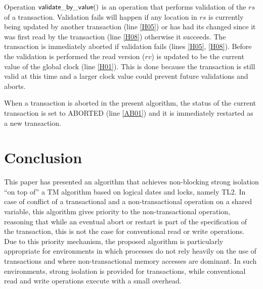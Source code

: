 \documentclass[11pt,letterpaper]{article}
\newcommand{\Xomit}[1]{}
\begin{document}
Operation ${\sf validate\_by\_value()}$ is an operation that performs 
validation of the $\mathit{rs}$ of a transaction. 
Validation fails 
will happen if any location in $\mathit{rs}$ is 
currently being updated by another transaction (line \ref{H05})
or has had its changed since it was first read by the transaction (line \ref{H08})
otherwise it succeeds.
The transaction is immediately aborted if validation fails (lines \ref{H05}, \ref{H08}).
Before the validation is performed the read version ($\mathit{rv}$) is updated
to be the current value of the global clock (line \ref{H01}).
This is done because the transaction is still valid at this time and a larger
clock value could prevent future validations and aborts.

When a transaction is aborted in the present algorithm, 
the status of the current transaction is set to ABORTED (line \ref{AB01}) and
it is immediately restarted as a new transaction.



\section{Conclusion}
\label{sec:conclusions}
This paper has presented an algorithm that achieves non-blocking strong 
isolation  ``on top of'' a TM algorithm based on logical dates and locks, 
namely  TL2. 
In case of conflict of a transactional and a non-transactional
operation on a shared variable, this algorithm gives priority to 
the non-transactional operation, 
reasoning that while an eventual abort or restart is part of the 
specification of the transaction,
this is not the case for conventional read or write operations. 
Due to this priority mechanism, 
the proposed algorithm is   particularly appropriate  for environments 
in which processes do not rely heavily
on the use of transactions and where non-transactional memory 
accesses are dominant. In 
such environments, strong isolation is  provided for transactions, 
while conventional read and write operations execute with a small overhead.


\Xomit{%
In order to implement this priority mechanism, 
the algorithm will often preemptively abort transactions 
on the sole suspicion that they might violate consistency, 
even though those transactions might have 
turned out to be acceptable. This results in an algorithm that 
is not permissive, in the intuitive sense of 
permissiveness \cite{Guerraoui:2008:PTM:1432291.1432313}. 
Future work would focus on creating 
a more permissive version of the algorithm as well as on 
examining the application of some of the 
algorithm principles to non-blocking TM algorithms in order 
to equip them with mechanisms that provide strong isolation.
}  %
\end{document}
